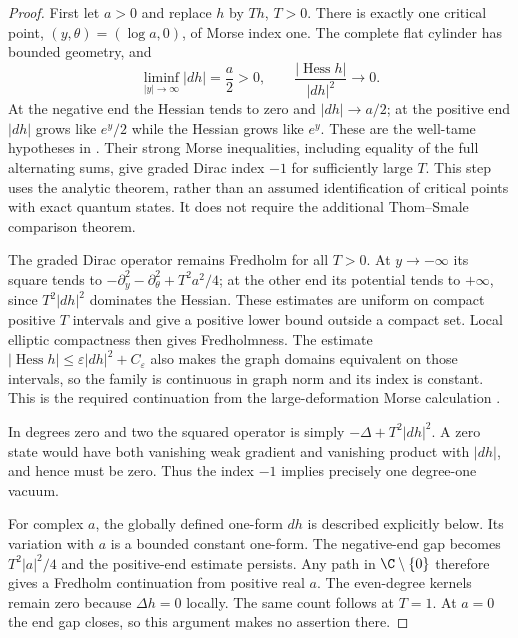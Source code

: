 \begin{proof}
First let $a>0$ and replace $h$ by $Th$, $T>0$.  There is exactly one
critical point, $(y,\theta)=(\log a,0)$, of Morse index one.  The
complete flat cylinder has bounded geometry, and
\begin{equation}
 \liminf_{|y|\to\infty}|dh|=\frac a2>0,
 \qquad
 \frac{|\operatorname{Hess}h|}{|dh|^2}\longrightarrow0.
 \label{ext-tame}
\end{equation}
At the negative end the Hessian tends to zero and $|dh|\to a/2$;
at the positive end $|dh|$ grows like $e^y/2$ while the Hessian grows
like $e^y$.  These are the well-tame hypotheses in \cite{DaiYan}.
Their strong Morse inequalities, including equality of the full
alternating sums, give graded Dirac index $-1$ for sufficiently
large $T$.  This step uses the analytic theorem, rather than an
assumed identification of critical points with exact quantum states.
It does not require the additional Thom--Smale comparison theorem.

The graded Dirac operator remains Fredholm for all $T>0$.  At
$y\to-\infty$ its square tends to
$-\partial_y^2-\partial_\theta^2+T^2a^2/4$; at the other end its
potential tends to $+\infty$, since $T^2|dh|^2$ dominates the Hessian.
These estimates are uniform on compact positive $T$ intervals and
give a positive lower bound outside a compact set.  Local elliptic
compactness then gives Fredholmness.  The estimate
$|\operatorname{Hess}h|\leq\varepsilon|dh|^2+C_\varepsilon$
also makes the graph domains equivalent on those intervals, so the
family is continuous in graph norm and its index is constant.
This is the required continuation from the large-deformation
Morse calculation \cite{WittenMorse,DaiYan}.

In degrees zero and two the squared operator is simply
$-\Delta+T^2|dh|^2$.  A zero state would have both vanishing weak
gradient and vanishing product with $|dh|$, and hence must be zero.
Thus the index $-1$ implies precisely one degree-one vacuum.

For complex $a$, the globally defined one-form $dh$ is described
explicitly below.  Its variation with $a$ is a bounded constant
one-form.  The negative-end gap becomes $T^2|a|^2/4$ and the
positive-end estimate persists.  Any path in $\C\setminus\{0\}$
therefore gives a Fredholm continuation from positive real $a$.
The even-degree kernels remain zero because $\Delta h=0$ locally.
The same count follows at $T=1$.  At $a=0$ the end gap closes, so
this argument makes no assertion there.
\end{proof}

